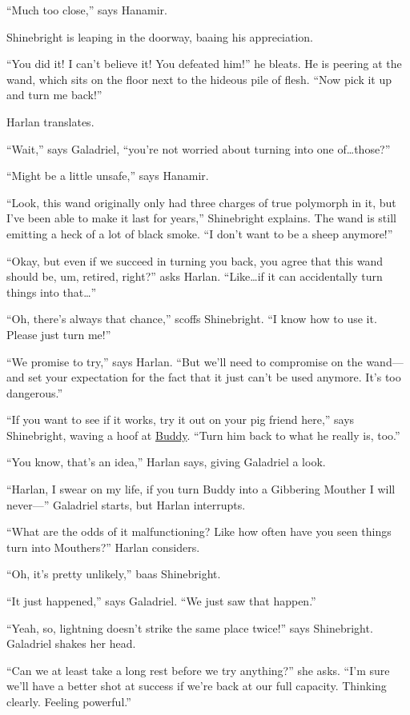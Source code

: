 \documentclass[smalldemyvopaper,11pt,twoside,onecolumn,openright,extrafontsizes]{memoir}
\begin{document}
``Much too close,'' says Hanamir.

Shinebright is leaping in the doorway, baaing his appreciation.

``You did it! I can't believe it! You defeated him!'' he bleats. He is
peering at the wand, which sits on the floor next to the hideous pile of
flesh. ``Now pick it up and turn me back!''

Harlan translates.

``Wait,'' says Galadriel, ``you're not worried about turning into one
of\ldots those?''

``Might be a little unsafe,'' says Hanamir.

``Look, this wand originally only had three charges of true polymorph in
it, but I've been able to make it last for years,'' Shinebright
explains. The wand is still emitting a heck of a lot of black smoke. ``I
don't want to be a sheep anymore!''

``Okay, but even if we succeed in turning you back, you agree that this
wand should be, um, retired, right?'' asks Harlan. ``Like\ldots if it
can accidentally turn things into that\ldots{}''

``Oh, there's always that chance,'' scoffs Shinebright. ``I know how to
use it. Please just turn me!''

``We promise to try,'' says Harlan. ``But we'll need to compromise on
the wand---and set your expectation for the fact that it just can't be
used anymore. It's too dangerous.''

``If you want to see if it works, try it out on your pig friend here,''
says Shinebright, waving a hoof at \href{/characters/buddy/}{Buddy}.
``Turn him back to what he really is, too.''

``You know, that's an idea,'' Harlan says, giving Galadriel a look.

``Harlan, I swear on my life, if you turn Buddy into a Gibbering Mouther
I will never---'' Galadriel starts, but Harlan interrupts.

``What are the odds of it malfunctioning? Like how often have you seen
things turn into Mouthers?'' Harlan considers.

``Oh, it's pretty unlikely,'' baas Shinebright.

``It just happened,'' says Galadriel. ``We just saw that happen.''

``Yeah, so, lightning doesn't strike the same place twice!'' says
Shinebright. Galadriel shakes her head.

``Can we at least take a long rest before we try anything?'' she asks.
``I'm sure we'll have a better shot at success if we're back at our full
capacity. Thinking clearly. Feeling powerful.''
\end{document}
